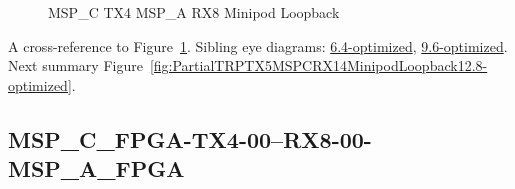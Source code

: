 \begin{figure}[h]
\begin{subfigure}{0.33\textwidth}
\hyperref[sec:MSPCFPGATX406RX806MSPAFPGA12.8-optimized]{}
\end{subfigure}\hspace*{\fill}
\begin{subfigure}{0.33\textwidth}
\hyperref[sec:MSPCFPGATX407RX807MSPAFPGA12.8-optimized]{}
\end{subfigure}\hspace*{\fill}
\begin{subfigure}{0.33\textwidth}
\hyperref[sec:MSPCFPGATX408RX808MSPAFPGA12.8-optimized]{}
\end{subfigure}

\begin{subfigure}{0.33\textwidth}
\hyperref[sec:MSPCFPGATX409RX809MSPAFPGA12.8-optimized]{}
\end{subfigure}\hspace*{\fill}
\begin{subfigure}{0.33\textwidth}
\hyperref[sec:MSPCFPGATX410RX810MSPAFPGA12.8-optimized]{}
\end{subfigure}\hspace*{\fill}
\begin{subfigure}{0.33\textwidth}
\hyperref[sec:MSPCFPGATX411RX811MSPAFPGA12.8-optimized]{}
\end{subfigure}

\caption{MSP\_C TX4 MSP\_A RX8 Minipod Loopback} \label{fig:MSPCTX4MSPARX8MinipodLoopback12.8-optimized}
\end{figure}

A cross-reference to Figure~\ref{fig:MSPCTX4MSPARX8MinipodLoopback12.8-optimized}.
Sibling eye diagrams: \hyperref[sec:MSPCTX4MSPARX8MinipodLoopback6.4-optimized]{6.4-optimized}, \hyperref[sec:MSPCTX4MSPARX8MinipodLoopback9.6-optimized]{9.6-optimized}. \\
Next summary Figure~\ref{fig:PartialTRPTX5MSPCRX14MinipodLoopback12.8-optimized}.
\clearpage
% 
\subsection{MSP\_C\_FPGA-TX4-00--RX8-00-MSP\_A\_FPGA}\label{sec:MSPCFPGATX400RX800MSPAFPGA12.8-optimized}

